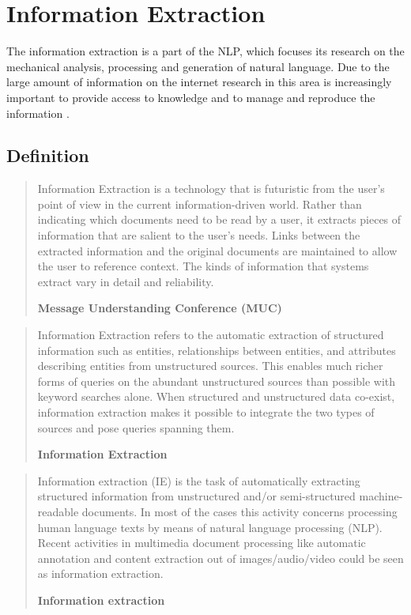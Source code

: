 \section{Information Extraction}
\label{sec:information-extraction}

The information extraction is a part of the \gls{NLP}, which focuses its research on the mechanical analysis, processing and generation of natural language. Due to the large amount of information on the internet research in this area is increasingly important to provide access to knowledge and to manage and reproduce the information \cite{Weinhofer:2010}\cite{Linsmayr:2010}.

\subsection{Definition}

\begin{quote}
Information Extraction is a technology that is futuristic from the user's point of view in the current information-driven world. Rather than indicating which documents need to be read by a user, it extracts pieces of information that are salient to the user's needs. Links between the extracted information and the original documents are maintained to allow the user to reference context. The kinds of information that systems extract vary in detail and reliability.

\hfill \textbf{Message Understanding Conference (MUC)}

\hfill \citeauthor{Chinchor:2001} \cite{Chinchor:2001}
\end{quote}

\begin{quote}
Information Extraction refers to the automatic extraction of structured information such as entities, relationships between entities, and attributes describing entities from unstructured sources. This enables much richer forms of queries on the abundant unstructured sources than possible with keyword searches alone. When structured and unstructured data co-exist, information extraction makes it possible to integrate the two types of sources and pose queries spanning them.

\hfill \textbf{Information Extraction}

\hfill \citeauthor{Sarawagi:2008} \cite{Sarawagi:2008}
\end{quote}

\begin{quote}
Information extraction (IE) is the task of automatically extracting structured information from unstructured and/or semi-structured machine-readable documents. In most of the cases this activity concerns processing human language texts by means of natural language processing (NLP). Recent activities in multimedia document processing like automatic annotation and content extraction out of images/audio/video could be seen as information extraction.

\hfill \textbf{Information extraction}

\hfill \citeauthor{Wikipedia:IE:2012} \cite{Wikipedia:IE:2012}
\end{quote}

